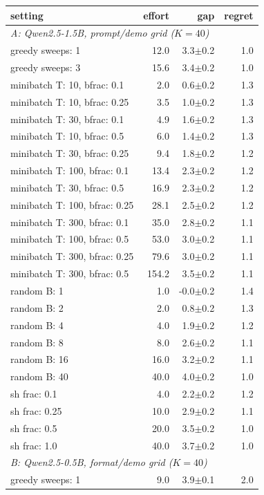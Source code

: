 \begin{tabular}{lrrr}\toprule
setting & effort & gap & regret \\\midrule
\multicolumn{4}{l}{\emph{A: Qwen2.5-1.5B, prompt/demo grid ($K{=}40$)}} \\
greedy sweeps: 1 & 12.0 & 3.3$\pm$0.2 & 1.0 \\
greedy sweeps: 3 & 15.6 & 3.4$\pm$0.2 & 1.0 \\
minibatch T: 10, bfrac: 0.1 & 2.0 & 0.6$\pm$0.2 & 1.3 \\
minibatch T: 10, bfrac: 0.25 & 3.5 & 1.0$\pm$0.2 & 1.3 \\
minibatch T: 30, bfrac: 0.1 & 4.9 & 1.6$\pm$0.2 & 1.3 \\
minibatch T: 10, bfrac: 0.5 & 6.0 & 1.4$\pm$0.2 & 1.3 \\
minibatch T: 30, bfrac: 0.25 & 9.4 & 1.8$\pm$0.2 & 1.2 \\
minibatch T: 100, bfrac: 0.1 & 13.4 & 2.3$\pm$0.2 & 1.2 \\
minibatch T: 30, bfrac: 0.5 & 16.9 & 2.3$\pm$0.2 & 1.2 \\
minibatch T: 100, bfrac: 0.25 & 28.1 & 2.5$\pm$0.2 & 1.2 \\
minibatch T: 300, bfrac: 0.1 & 35.0 & 2.8$\pm$0.2 & 1.1 \\
minibatch T: 100, bfrac: 0.5 & 53.0 & 3.0$\pm$0.2 & 1.1 \\
minibatch T: 300, bfrac: 0.25 & 79.6 & 3.0$\pm$0.2 & 1.1 \\
minibatch T: 300, bfrac: 0.5 & 154.2 & 3.5$\pm$0.2 & 1.1 \\
random B: 1 & 1.0 & -0.0$\pm$0.2 & 1.4 \\
random B: 2 & 2.0 & 0.8$\pm$0.2 & 1.3 \\
random B: 4 & 4.0 & 1.9$\pm$0.2 & 1.2 \\
random B: 8 & 8.0 & 2.6$\pm$0.2 & 1.1 \\
random B: 16 & 16.0 & 3.2$\pm$0.2 & 1.1 \\
random B: 40 & 40.0 & 4.0$\pm$0.2 & 1.0 \\
sh frac: 0.1 & 4.0 & 2.2$\pm$0.2 & 1.2 \\
sh frac: 0.25 & 10.0 & 2.9$\pm$0.2 & 1.1 \\
sh frac: 0.5 & 20.0 & 3.5$\pm$0.2 & 1.0 \\
sh frac: 1.0 & 40.0 & 3.7$\pm$0.2 & 1.0 \\
\multicolumn{4}{l}{\emph{B: Qwen2.5-0.5B, format/demo grid ($K{=}40$)}} \\
greedy sweeps: 1 & 9.0 & 3.9$\pm$0.1 & 2.0 \\

\end{tabular}
